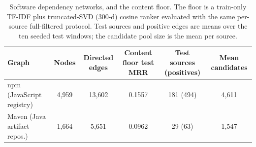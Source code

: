 \begin{table}[t]
\caption{Software dependency networks, and the content floor. The floor is a train-only
TF-IDF plus truncated-SVD (300-d) cosine ranker evaluated with the same per-source
full-filtered protocol. Test sources and positive edges are means over the ten seeded test
windows; the candidate pool size is the mean per source.}
\label{tab:datasets}
\begin{tabular}{lccccc}
\toprule
Graph & Nodes & Directed edges & Content floor test MRR & Test sources (positives) & Mean candidates \\
\midrule
npm (JavaScript registry) & 4{,}959 & 13{,}602 & 0.1557 & 181 (494) & 4{,}611 \\
Maven (Java artifact repos.) & 1{,}664 & 5{,}651 & 0.0962 & 29 (63) & 1{,}547 \\
\bottomrule
\end{tabular}
\end{table}
